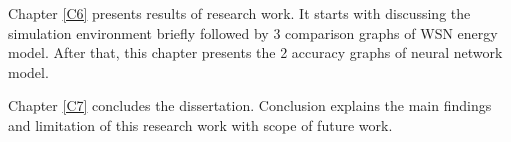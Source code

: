 \par Chapter \ref{C6} presents results of research work. It starts with discussing the simulation environment briefly followed by 3 comparison graphs of WSN energy model. After that, this chapter presents the 2 accuracy graphs of neural network model.
\par Chapter \ref{C7} concludes the dissertation. Conclusion explains the main findings and limitation of this research work with scope of future work.